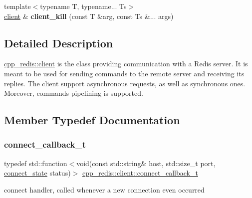 \begin{DoxyCompactItemize}
\item 
\mbox{\label{classcpp__redis_1_1client_ab3095cf010e10e9aa0b17a4408e6652e}} 
{\footnotesize template$<$typename T, typename... Ts$>$ }\\\hyperlink{classcpp__redis_1_1client}{client} \& {\bfseries client\+\_\+kill} (const T \&arg, const Ts \&... args)
\end{DoxyCompactItemize}


\subsection{Detailed Description}
\hyperlink{classcpp__redis_1_1client}{cpp\+\_\+redis\+::client} is the class providing communication with a Redis server. It is meant to be used for sending commands to the remote server and receiving its replies. The client support asynchronous requests, as well as synchronous ones. Moreover, commands pipelining is supported. 

\subsection{Member Typedef Documentation}
\mbox{\label{classcpp__redis_1_1client_a4bb592b64ededde5a6fcf8111ca2548f}} 
\subsubsection{\texorpdfstring{connect\+\_\+callback\+\_\+t}{connect\_callback\_t}}
{\footnotesize\ttfamily typedef std\+::function$<$void(const std\+::string\& host, std\+::size\+\_\+t port, \hyperlink{classcpp__redis_1_1client_a2512bd48dd45391249a69bd720c1e4da}{connect\+\_\+state} status)$>$ \hyperlink{classcpp__redis_1_1client_a4bb592b64ededde5a6fcf8111ca2548f}{cpp\+\_\+redis\+::client\+::connect\+\_\+callback\+\_\+t}}

connect handler, called whenever a new connection even occurred \mbox{\label{classcpp__redis_1_1client_a061a1140d36d2eaeda82b09a0bb3f9f2}} 
